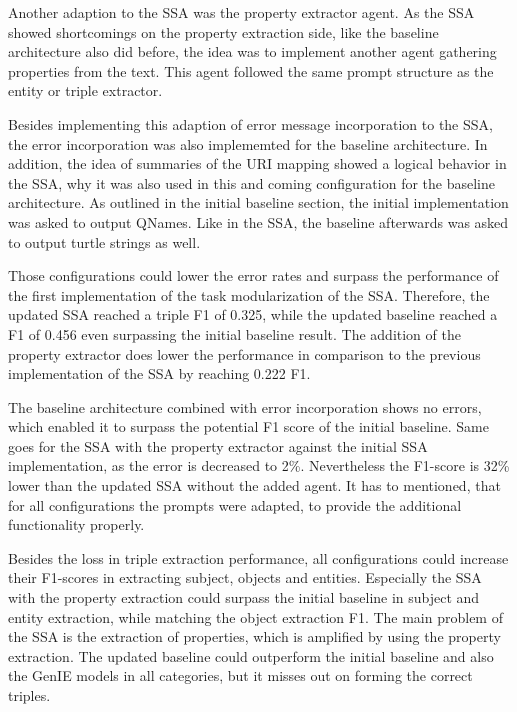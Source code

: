\documentclass[a4paper,oneside,bibliography=totoc]{scrbook}
\begin{document}
Another adaption to the \ac{SSA} was the property extractor agent. As the \ac{SSA} showed shortcomings on the property extraction side, like the baseline architecture also did before, the idea was to implement another agent gathering properties from the text. This agent followed the same prompt structure as the entity or triple extractor.

Besides implementing this adaption of error message incorporation to the \ac{SSA}, the error incorporation was also implememted for the baseline architecture. In addition, the idea of summaries of the URI mapping showed a logical behavior in the \ac{SSA}, why it was also used in this and coming configuration for the baseline architecture. As outlined in the initial baseline section, the initial implementation was asked to output QNames. Like in the \ac{SSA}, the baseline afterwards was asked to output turtle strings as well.

Those configurations could lower the error rates and surpass the performance of the first implementation of the task modularization of the \ac{SSA}. Therefore, the updated \ac{SSA} reached a triple F1 of 0.325, while the updated baseline reached a F1 of 0.456 even surpassing the initial baseline result. The addition of the property extractor does lower the performance in comparison to the previous implementation of the \ac{SSA} by reaching 0.222 F1.

The baseline architecture combined with error incorporation shows no errors, which enabled it to surpass the potential F1 score of the initial baseline. Same goes for the \ac{SSA} with the property extractor against the initial \ac{SSA} implementation, as the error is decreased to 2\%. Nevertheless the F1-score is 32\% lower than the updated \ac{SSA} without the added agent. It has to mentioned, that for all configurations the prompts were adapted, to provide the additional functionality properly.

Besides the loss in triple extraction performance, all configurations could increase their F1-scores in extracting subject, objects and entities. Especially the \ac{SSA} with the property extraction could surpass the initial baseline in subject and entity extraction, while matching the object extraction F1. The main problem of the \ac{SSA} is the extraction of properties, which is amplified by using the property extraction. The updated baseline could outperform the initial baseline and also the GenIE models in all categories, but it misses out on forming the correct triples.
\end{document}

